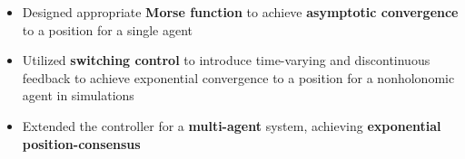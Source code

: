 \documentclass[10pt,letterpaper,sans]{moderncv}        %
\begin{document}
\begin{itemize}
\item Designed appropriate \textbf{Morse function} to achieve \textbf{asymptotic convergence} to a position for a single agent %
\item Utilized \textbf{switching control} to introduce time-varying and discontinuous feedback to achieve exponential convergence to a position for a nonholonomic agent in simulations
\item Extended the controller for a \textbf{multi-agent} system, achieving \textbf{exponential position-consensus} 




\end{itemize}
\end{document}
